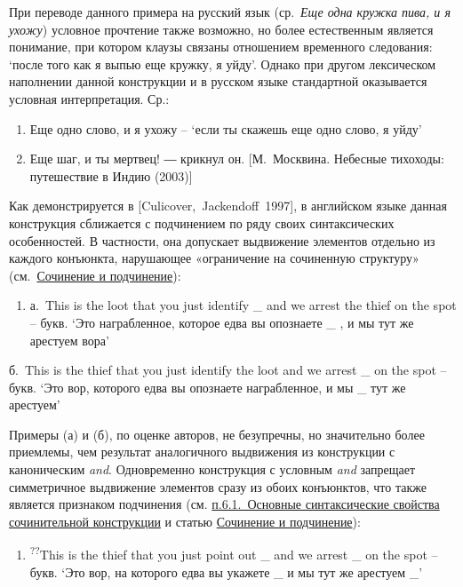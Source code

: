 При переводе данного примера на русский язык (ср.~\emph{Еще одна кружка
пива, и я ухожу}) условное прочтение также возможно, но более
естественным является понимание, при котором клаузы связаны отношением
временного следования: `после того как я выпью еще кружку, я уйду'.
Однако при другом лексическом наполнении данной конструкции и в русском
языке стандартной оказывается условная интерпретация. Ср.:

\begin{enumerate}
\def\labelenumi{(\arabic{enumi})}
\setcounter{enumi}{57}
\item
  Еще одно слово, и я ухожу -- `если ты скажешь еще одно слово, я уйду'
\item
  Еще шаг, и ты мертвец! ― крикнул он. {[}М.~Москвина. Небесные
  тихоходы: путешествие в Индию (2003){]}
\end{enumerate}

Как демонстрируется в {[}Culicover,~Jackendoff~1997{]}, в английском
языке данная конструкция сближается с подчинением по ряду своих
синтаксических особенностей. В частности, она допускает выдвижение
элементов отдельно из каждого конъюнкта, нарушающее «ограничение на
сочиненную структуру» (см.~\underline{Сочинение и подчинение}):

\begin{enumerate}
\def\labelenumi{(\arabic{enumi})}
\setcounter{enumi}{59}
\item
  а.~This is the loot that you just identify \_ and we arrest the thief
  on the spot -- букв. `Это награбленное, которое едва вы опознаете \_ ,
  и мы тут же арестуем вора'
\end{enumerate}

б.~This is the thief that you just identify the loot and we arrest \_ on
the spot -- букв. `Это вор, которого едва вы опознаете награбленное, и
мы \_ тут же арестуем'

Примеры (а) и (б), по оценке авторов, не безупречны, но значительно
более приемлемы, чем результат аналогичного выдвижения из конструкции с
каноническим \emph{and}. Одновременно конструкция с условным \emph{and}
запрещает симметричное выдвижение элементов сразу из обоих конъюнктов,
что также является признаком подчинения (см. \underline{п.6.1.~Основные
синтаксические свойства сочинительной конструкции} и статью
\underline{Сочинение и подчинение}):

\begin{enumerate}
\def\labelenumi{(\arabic{enumi})}
\setcounter{enumi}{60}
\item
  \textsuperscript{??}This is the thief that you just point out \_ and
  we arrest \_ on the spot -- букв. `Это вор, на которого едва вы
  укажете \_ и мы тут же арестуем \_'
\end{enumerate}

